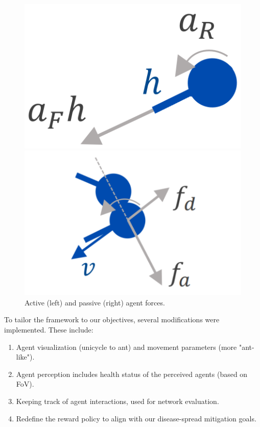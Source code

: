 \documentclass[9pt]{IEEEtran}
\begin{document}
\begin{figure}[hbt]
    \centering
    \begin{minipage}{0.20\textwidth}
        \centering
        \includegraphics[width=\textwidth]{agent_active.png}
    \end{minipage}
    \begin{minipage}{0.25\textwidth}
        \centering
        \includegraphics[width=\textwidth]{agent_passive.png}
    \end{minipage}
    \caption{Active (left) and passive (right) agent forces. \cite{li2023predator}}
    \label{fig:main_figure}
\end{figure}

To tailor the framework to our objectives, several modifications were implemented. These include:
\begin{enumerate}
    \item Agent visualization (unicycle to ant) and movement parameters (more "ant-like").
    \item Agent perception includes health status of the perceived agents (based on FoV).
    \item Keeping track of agent interactions, used for network evaluation.
    \item Redefine the reward policy to align with our disease-spread mitigation goals.
\end{enumerate}
\end{document}
